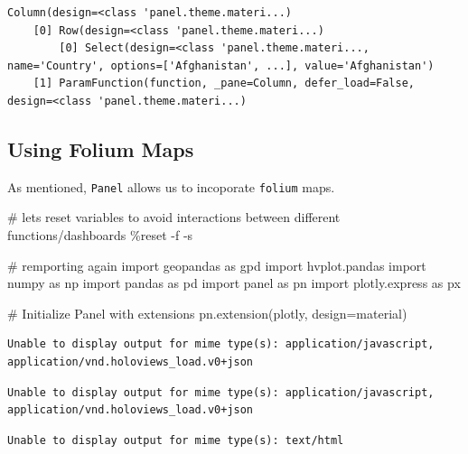\documentclass[
  letterpaper,
  DIV=11,
  numbers=noendperiod]{scrreprt}
\newenvironment{Shaded}{\begin{snugshade}}{\end{snugshade}}
\newcommand{\CommentTok}[1]{\textcolor[rgb]{0.37,0.37,0.37}{#1}}
\newcommand{\ImportTok}[1]{\textcolor[rgb]{0.00,0.46,0.62}{#1}}
\newcommand{\NormalTok}[1]{\textcolor[rgb]{0.00,0.23,0.31}{#1}}
\newcommand{\OperatorTok}[1]{\textcolor[rgb]{0.37,0.37,0.37}{#1}}
\newcommand{\StringTok}[1]{\textcolor[rgb]{0.13,0.47,0.30}{#1}}
\begin{document}
\begin{verbatim}
Column(design=<class 'panel.theme.materi...)
    [0] Row(design=<class 'panel.theme.materi...)
        [0] Select(design=<class 'panel.theme.materi..., name='Country', options=['Afghanistan', ...], value='Afghanistan')
    [1] ParamFunction(function, _pane=Column, defer_load=False, design=<class 'panel.theme.materi...)
\end{verbatim}

\subsection{Using Folium Maps}\label{using-folium-maps}

As mentioned, \texttt{Panel} allows us to incoporate \texttt{folium}
maps.

\begin{Shaded}
\begin{Highlighting}[]
\CommentTok{\# let\textquotesingle{}s reset variables to avoid interactions between different functions/dashboards}
\OperatorTok{\%}\NormalTok{reset }\OperatorTok{{-}}\NormalTok{f }\OperatorTok{{-}}\NormalTok{s}

\CommentTok{\# remporting again}
\ImportTok{import}\NormalTok{ geopandas }\ImportTok{as}\NormalTok{ gpd}
\ImportTok{import}\NormalTok{ hvplot.pandas}
\ImportTok{import}\NormalTok{ numpy }\ImportTok{as}\NormalTok{ np}
\ImportTok{import}\NormalTok{ pandas }\ImportTok{as}\NormalTok{ pd}
\ImportTok{import}\NormalTok{ panel }\ImportTok{as}\NormalTok{ pn}
\ImportTok{import}\NormalTok{ plotly.express }\ImportTok{as}\NormalTok{ px}

\CommentTok{\# Initialize Panel with extensions}
\NormalTok{pn.extension(}\StringTok{\textquotesingle{}plotly\textquotesingle{}}\NormalTok{, design}\OperatorTok{=}\StringTok{\textquotesingle{}material\textquotesingle{}}\NormalTok{)}
\end{Highlighting}
\end{Shaded}

\begin{verbatim}
Unable to display output for mime type(s): application/javascript, application/vnd.holoviews_load.v0+json
\end{verbatim}

\begin{verbatim}
Unable to display output for mime type(s): application/javascript, application/vnd.holoviews_load.v0+json
\end{verbatim}

\begin{verbatim}
Unable to display output for mime type(s): text/html
\end{verbatim}
\end{document}
